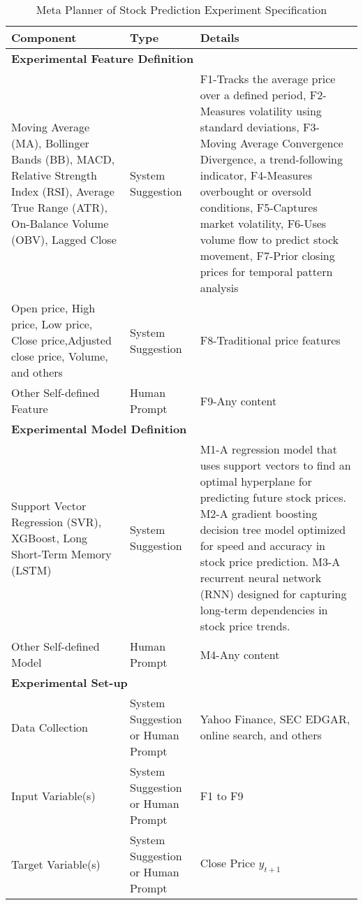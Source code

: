 \begin{table*}[th!]
\caption{Meta Planner of Stock Prediction Experiment Specification}
\label{tab:StockPrediction}
\vspace{-,1in}
\centering
\small
\begin{tabular}{|p{3.6cm}|p{3.0cm}|p{5.2cm}|}
\hline
\textbf{Component} & \textbf{Type} & \textbf{Details} \\
\hline

\multicolumn{3}{|l|}{\textbf{Experimental Feature Definition}} \\
\hline
Moving Average (MA), Bollinger Bands (BB), MACD, Relative Strength Index (RSI), Average True Range (ATR), On-Balance Volume (OBV), Lagged Close   & System Suggestion & F1-Tracks the average price over a defined period, F2-Measures volatility using standard deviations, F3-Moving Average Convergence Divergence, a trend-following indicator, F4-Measures overbought or oversold conditions, F5-Captures market volatility, F6-Uses volume flow to predict stock movement, F7-Prior closing prices for temporal pattern analysis \\
\hline 
Open price, High price, Low price, Close price,Adjusted close price, Volume, and others & System Suggestion & F8-Traditional price features \\
\hline
Other Self-defined Feature & Human Prompt & F9-Any content \\
\hline
\multicolumn{3}{|l|}{\textbf{Experimental Model Definition}} \\
\hline
Support Vector Regression (SVR), XGBoost, Long Short-Term Memory (LSTM)  & System Suggestion & M1-A regression model that uses support vectors to find an optimal hyperplane for predicting future stock prices. M2-A gradient boosting decision tree model optimized for speed and accuracy in stock price prediction. M3-A recurrent neural network (RNN) designed for capturing long-term dependencies in stock price trends.   \\
\hline
Other Self-defined Model & Human Prompt & M4-Any content \\
\hline
\multicolumn{3}{|l|}{\textbf{Experimental Set-up}} \\
\hline
Data Collection & System Suggestion or Human Prompt & Yahoo Finance, SEC EDGAR, online search, and others \\
\hline
Input Variable(s) & System Suggestion or Human Prompt &  F1 to F9 \\
\hline
Target Variable(s) & System Suggestion or Human Prompt & Close Price $y_{t+1}$ \\

\end{tabular}
\end{table*}
